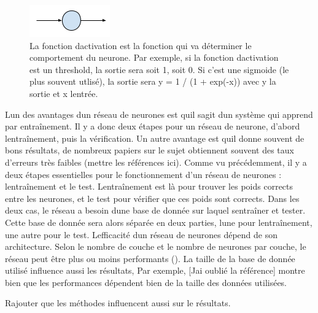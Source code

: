 \documentclass[11pt]{sdm}
\begin{document}
		\bigbreak

		\begin{figure}[!ht]
			\centering
			\includegraphics[natwidth=131,natheight=52]{figures/neural.png}
			\caption{La fonction d\textquotesingle activation est la fonction qui va d\'eterminer le comportement du neurone. Par exemple, si la fonction d\textquotesingle activation est un threshold, la sortie sera soit 1, soit 0. Si c’est une sigmoide (le plus souvent utlis\'e), la sortie sera y = 1 / (1 + exp(-x)) avec y la sortie et x l\textquotesingle entr\'ee.}
			\label{fig:neural}
		\end{figure}
	
		\bigbreak
		\bigbreak

		L\textquotesingle un des avantages d\textquotesingle un r\'eseau de neurones est qu\textquotesingle il s\textquotesingle agit d\textquotesingle un syst\`eme qui apprend par entra\^inement. Il y a donc deux \'etapes pour un r\'eseau de neurone, d’abord l\textquotesingle entra\^inement, puis la v\'erification. Un autre avantage est qu\textquotesingle il donne souvent de bons r\'esultats, de nombreux papiers sur le sujet obtiennent souvent des taux d’erreurs tr\`es faibles (mettre les r\'ef\'erences ici).
		Comme vu pr\'ec\'edemment, il y a deux \'etapes essentielles pour le fonctionnement d’un r\'eseau de neurones : l\textquotesingle entra\^inement et le test. L\textquotesingle entra\^inement est l\`a pour trouver les poids corrects entre les neurones, et le test pour v\'erifier que ces poids sont corrects. Dans les deux cas, le r\'eseau a besoin d\textquotesingle une base de donn\'ee sur laquel s\textquotesingle entra\^iner et tester. Cette base de donn\'ee sera alors s\'epar\'ee en deux parties, l\textquotesingle une pour l\textquotesingle entra\^inement, une autre pour le test.
		L\textquotesingle efficacit\'e d\textquotesingle un r\'eseau de neurones d\'epend de son architecture. Selon le nombre de couche et le nombre de neurones par couche, le r\'eseau peut \^etre plus ou moins performants (\cite{chatfield2014return}\cite{srivastava2014dropout}). La taille de la base de donn\'ee utilis\'e influence aussi les r\'esultats, Par exemple, [J\textquotesingle ai oubli\'e la r\'ef\'erence] montre bien que les performances d\'ependent bien de la taille des donn\'ees utilis\'ees. \begin{itshape} Rajouter que les m\'ethodes influencent aussi sur le r\'esultats. \end{itshape}
\end{document}
